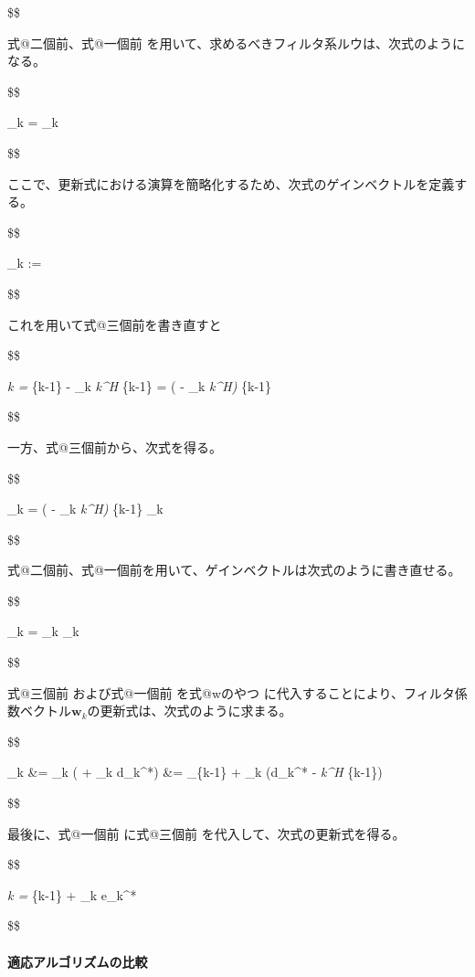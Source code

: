\$\$

式@二個前、式@一個前
を用いて、求めるべきフィルタ系ルウは、次式のようになる。

\$\$

\_k = \_k 

\$\$

ここで、更新式における演算を簡略化するため、次式のゲインベクトルを定義する。

\$\$

\_k :=

\$\$

これを用いて式@三個前を書き直すと

\$\$

\emph{k = }\{k-1\} - \_k \emph{k\^{}H
}\{k-1\} = ( - \_k \emph{k\^{}H) }\{k-1\}

\$\$

一方、式@三個前から、次式を得る。

\$\$

\_k = ( - \_k \emph{k\^{}H) }\{k-1\}
\_k

\$\$

式@二個前、式@一個前を用いて、ゲインベクトルは次式のように書き直せる。

\$\$

\_k = \_k \_k

\$\$

式@三個前 および式@一個前 を式@wのやつ
に代入することにより、フィルタ係数ベクトル\(\bm{w}_k\)の更新式は、次式のように求まる。

\$\$

\_k \&= \_k ( + \_k d\_k\^{}*) \&=
\_\{k-1\} + \_k (d\_k\^{}* - \emph{k\^{}H
}\{k-1\})

\$\$

最後に、式@一個前 に式@三個前 を代入して、次式の更新式を得る。

\$\$

\emph{k = }\{k-1\} + \_k e\_k\^{}*

\$\$

\hypertarget{ux9069ux5fdcux30a2ux30ebux30b4ux30eaux30baux30e0ux306eux6bd4ux8f03}{%
\paragraph{適応アルゴリズムの比較}\label{ux9069ux5fdcux30a2ux30ebux30b4ux30eaux30baux30e0ux306eux6bd4ux8f03}}

